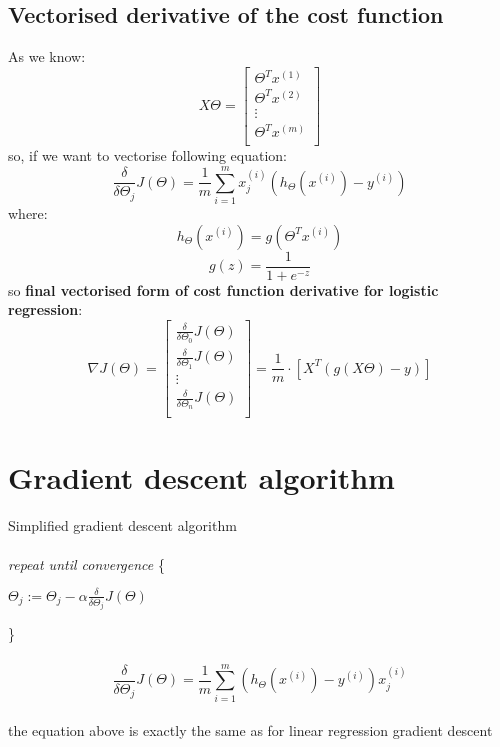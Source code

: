 \documentclass{article} %
\begin{document}
\subsection{Vectorised derivative of the cost function} 
As we know:
\begin{equation*}
X \Theta = 
\begin{bmatrix} 
\Theta^Tx^{(1)} \\ 
\Theta^Tx^{(2)} \\
\vdots \\
\Theta^Tx^{(m)}\\
\end{bmatrix}  
\end{equation*}
so, if we want to vectorise following equation:
\begin{equation}
\frac{\delta}{\delta\Theta_j}J(\Theta) = \frac{1}{m} \sum_{i=1}^m x_j^{(i)}(h_\Theta(x^{(i)}) - y^{(i)}) 
\end{equation}
where:
\begin{equation*}
h_{\Theta}(x^{(i)}) = g(\Theta^Tx^{(i)})
\end{equation*}
\begin{equation*} 
g(z) = \frac{1}{1 + e^{-z}}  
\end{equation*}
so \textbf{final vectorised form of cost function derivative for logistic regression}:
\begin{equation}
\nabla J(\Theta) = 
\begin{bmatrix} 
\frac{\delta}{\delta\Theta_0}J(\Theta)\\ 
\frac{\delta}{\delta\Theta_1}J(\Theta) \\
\vdots \\
\frac{\delta}{\delta\Theta_n}J(\Theta)\\
\end{bmatrix}  
= \frac{1}{m}\cdot
\left[X^T(g(X\Theta)-y)\right]
\end{equation}
\newline
\newline

\section{Gradient descent algorithm}
Simplified gradient descent algorithm\\
\\
\textit{repeat until convergence} \{
\begin{tabbing}
\hspace{1cm}$\Theta_j:=  \Theta_j  -  \alpha  \frac{\delta}{\delta\Theta_j}J(\Theta)$
\end{tabbing}
\}\\
\\
\begin{equation}
\frac{\delta}{\delta\Theta_j}J(\Theta) = \frac{1}{m} \sum_{i=1}^m (h_\Theta(x^{(i)}) - y^{(i)}) x_j^{(i)}
\end{equation}
\\
the equation above is exactly the same as for linear regression gradient descent   
\end{document}
